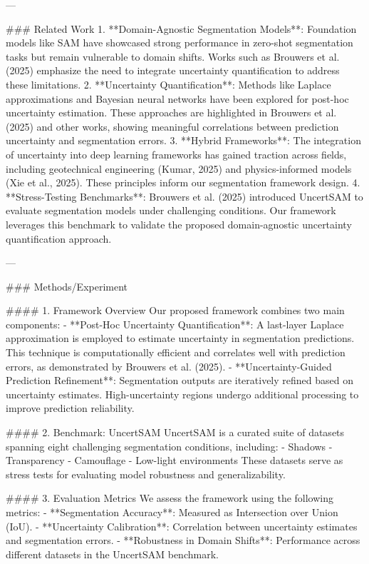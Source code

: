---

### Related Work  
1. **Domain-Agnostic Segmentation Models**: Foundation models like SAM have showcased strong performance in zero-shot segmentation tasks but remain vulnerable to domain shifts. Works such as Brouwers et al. (2025) emphasize the need to integrate uncertainty quantification to address these limitations.
2. **Uncertainty Quantification**: Methods like Laplace approximations and Bayesian neural networks have been explored for post-hoc uncertainty estimation. These approaches are highlighted in Brouwers et al. (2025) and other works, showing meaningful correlations between prediction uncertainty and segmentation errors.
3. **Hybrid Frameworks**: The integration of uncertainty into deep learning frameworks has gained traction across fields, including geotechnical engineering (Kumar, 2025) and physics-informed models (Xie et al., 2025). These principles inform our segmentation framework design.
4. **Stress-Testing Benchmarks**: Brouwers et al. (2025) introduced UncertSAM to evaluate segmentation models under challenging conditions. Our framework leverages this benchmark to validate the proposed domain-agnostic uncertainty quantification approach.

---

### Methods/Experiment  

#### 1. Framework Overview  
Our proposed framework combines two main components:
- **Post-Hoc Uncertainty Quantification**: A last-layer Laplace approximation is employed to estimate uncertainty in segmentation predictions. This technique is computationally efficient and correlates well with prediction errors, as demonstrated by Brouwers et al. (2025).  
- **Uncertainty-Guided Prediction Refinement**: Segmentation outputs are iteratively refined based on uncertainty estimates. High-uncertainty regions undergo additional processing to improve prediction reliability.

#### 2. Benchmark: UncertSAM  
UncertSAM is a curated suite of datasets spanning eight challenging segmentation conditions, including:
- Shadows
- Transparency
- Camouflage
- Low-light environments  
These datasets serve as stress tests for evaluating model robustness and generalizability.

#### 3. Evaluation Metrics  
We assess the framework using the following metrics:
- **Segmentation Accuracy**: Measured as Intersection over Union (IoU).  
- **Uncertainty Calibration**: Correlation between uncertainty estimates and segmentation errors.  
- **Robustness in Domain Shifts**: Performance across different datasets in the UncertSAM benchmark.

